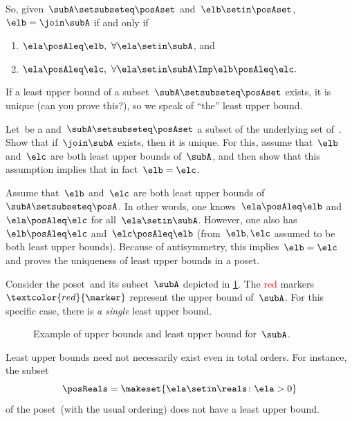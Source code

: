 So, given~$\subA \setsubseteq \posAset$ and~$\elb \setin \posAset$,~$\elb = \join \subA$ if and only if
\begin{enumerate}
    \item $\ela \posAleq \elb, \ \forall \ela \setin \subA$, and
    \item $\ela \posAleq \elc, \ \forall \ela \setin \subA \Imp \elb \posAleq \elc.
          $
\end{enumerate}

If a least upper bound of a subset~$\subA \setsubseteq \posAset$ exists, it is unique (can you prove this?), so we speak of ``the'' least upper bound.

\begin{exercise}
    Let~\posA be a  and~$\subA \setsubseteq \posAset$ a subset of the underlying set of~\posA.
    Show that if~$\join \subA$ exists, then it is unique.
    For this, assume that~$\elb$ and~$\elc$ are both least upper bounds of~$\subA$, and then show that this assumption implies that in fact~$\elb = \elc$.
\end{exercise}
\begin{solution}
    Assume that~$\elb$ and~$\elc$ are both least upper bounds of~$\subA \setsubseteq \posA$.
    In other words, one knows~$\ela \posAleq \elb$ and~$\ela\posAleq \elc$ for all~$\ela\setin \subA$.
    However, one also has~$\elb\posAleq \elc$ and~$\elc\posAleq \elb$ (from~$\elb,\elc$ assumed to be both least upper bounds).
    Because of antisymmetry, this implies~$\elb=\elc$ and proves the uniqueness of least upper bounds in a poset.
\end{solution}

\begin{example}
    Consider the poset~\posA and its subset~$\subA$ depicted in \cref{fig:upper_bound_example_bis}.
    The \textcolor{red}{red} markers~$\textcolor{red}{\marker}$ represent the upper bound of~$\subA$.
    For this specific case, there is \emph{a single} least upper bound.
\end{example}

\begin{figure}[h!]
    \caption{Example of upper bounds and least upper bound for~$\subA$.}
    \label{fig:upper_bound_example_bis}
\end{figure}
\begin{example}
    Least upper bounds need not necessarily exist even in total orders.
    For instance, the subset
    \begin{equation}
        \posReals = \makeset{\ela \setin \reals \colon \ela>0}
    \end{equation}
    of the poset~\reals (with the usual ordering) does not have a least upper bound.
\end{example}


